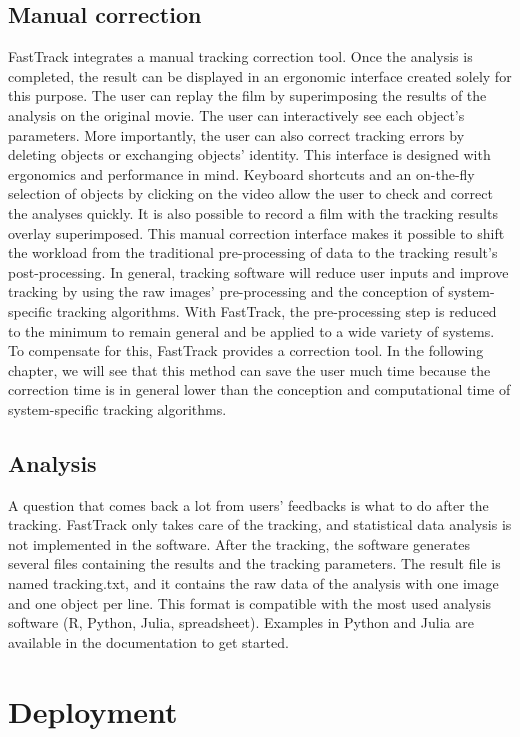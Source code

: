     \subsection{Manual correction}
    FastTrack integrates a manual tracking correction tool. Once the analysis is completed, the result can be displayed in an ergonomic interface created solely for this purpose. The user can replay the film by superimposing the results of the analysis on the original movie. The user can interactively see each object's parameters. More importantly, the user can also correct tracking errors by deleting objects or exchanging objects' identity.
    This interface is designed with ergonomics and performance in mind. Keyboard shortcuts and an on-the-fly selection of objects by clicking on the video allow the user to check and correct the analyses quickly. It is also possible to record a film with the tracking results overlay superimposed.
    This manual correction interface makes it possible to shift the workload from the traditional pre-processing of data to the tracking result's post-processing. In general, tracking software will reduce user inputs and improve tracking by using the raw images' pre-processing and the conception of system-specific tracking algorithms. With FastTrack, the pre-processing step is reduced to the minimum to remain general and be applied to a wide variety of systems. To compensate for this, FastTrack provides a correction tool. In the following chapter, we will see that this method can save the user much time because the correction time is in general lower than the conception and computational time of system-specific tracking algorithms.

    \subsection{Analysis}
    A question that comes back a lot from users' feedbacks is what to do after the tracking. FastTrack only takes care of the tracking, and statistical data analysis is not implemented in the software. After the tracking, the software generates several files containing the results and the tracking parameters. The result file is named tracking.txt, and it contains the raw data of the analysis with one image and one object per line. This format is compatible with the most used analysis software (R, Python, Julia, spreadsheet). Examples in Python and Julia are available in the documentation to get started.

	\section{Deployment}
